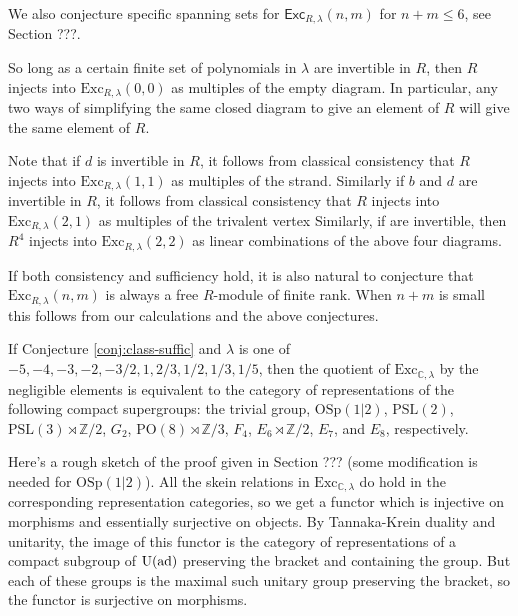 \documentclass[12pt]{amsart}
\begin{document}
We also conjecture specific spanning sets for $\mathsf{Exc}_{R,\lambda}(n,m)$ for $n+m \leq 6$, see Section ???.

\begin{conjecture}
  \label{conj:class-consist}
So long as a certain finite set of polynomials in $\lambda$ are invertible in $R$, then $R$ injects into $\mathrm{Exc}_{R,\lambda}(0,0)$ as multiples of the empty diagram.  In particular, any two ways of simplifying the same closed diagram to give an element of $R$ will give the same element of $R$.
\end{conjecture}

Note that if $d$ is invertible in $R$, it follows from classical consistency that $R$ injects into $\mathrm{Exc}_{R,\lambda}(1,1)$ as multiples of the strand.  Similarly if $b$ and $d$ are invertible in $R$, it follows from classical consistency that $R$ injects into $\mathrm{Exc}_{R,\lambda}(2,1)$ as multiples of the trivalent vertex  Similarly, if  are invertible, then $R^4$ injects into $\mathrm{Exc}_{R,\lambda}(2,2)$ as linear combinations of the above four diagrams.


If both consistency and sufficiency hold, it is also natural to conjecture that $\mathrm{Exc}_{R,\lambda}(n,m)$ is always a free $R$-module of finite rank.  When $n+m$ is small this follows from our calculations and the above conjectures.

\begin{corollary}
If Conjecture \ref{conj:class-suffic} and
$\lambda$ is one of $-5, -4, -3, -2, -3/2,1,2/3,1/2, 1/3, 1/5$, then the quotient of $\mathrm{Exc}_{\mathbb{C},\lambda}$ by the negligible elements is equivalent to the category of representations of the following compact supergroups: the trivial group, $\mathrm{OSp}(1 | 2)$, $\mathrm{PSL}(2)$, $\mathrm{PSL}(3) \rtimes \mathbb{Z}/2$, $G_2$, $\mathrm{PO}(8) \rtimes \mathbb{Z}/3$, $F_4$, $E_6 \rtimes \mathbb{Z}/2$, $E_7$, and $E_8$, respectively.
\end{corollary}

Here's a rough sketch of the proof given in Section ??? (some modification is needed for $\mathrm{OSp}(1|2)$).  All the skein relations in $\mathrm{Exc}_{\mathbb{C},\lambda}$ do hold in the corresponding representation categories, so we get a functor which is injective on morphisms and essentially surjective on objects.  By Tannaka-Krein duality and unitarity, the image of this functor is the category of representations of a compact subgroup of $\mathrm{U}(\operatorname{ad})$ preserving the bracket and containing the group.  But each of these groups is the maximal such unitary group preserving the bracket, so the functor is surjective on morphisms.  
\end{document}
